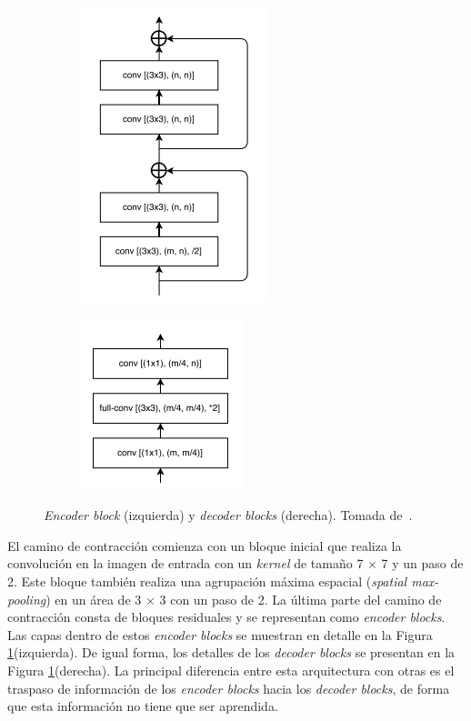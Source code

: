 \begin{figure}[ht]
	\centering
	\begin{subfigure}
		\centering
		\includegraphics[width=.4\linewidth]{./Graphics/encoder.png}
	\end{subfigure}
	\begin{subfigure}
		\centering
		\includegraphics[width=.4\linewidth]{./Graphics/decoder.png}
	\end{subfigure}
	\caption{\textit{Encoder block} (izquierda) y \textit{decoder blocks} (derecha). Tomada de~\cite{chaurasia2017linknet}.}
	\label{fig:blocks}
\end{figure}

El camino de contracción comienza con un bloque inicial que realiza la convolución en la imagen de entrada con un \textit{kernel} de tamaño 7 $\times$ 7 y un paso de 2. Este bloque también realiza una agrupación máxima espacial (\textit{spatial max-pooling}) en un área de 3 $\times$ 3 con un paso de 2. La última parte del camino de contracción consta de bloques residuales y se representan como \textit{encoder blocks}. Las capas dentro de estos \textit{encoder blocks} se muestran en detalle en la Figura \ref{fig:blocks}(izquierda). De igual forma, los detalles de los \textit{decoder blocks} se presentan en la Figura \ref{fig:blocks}(derecha). La principal diferencia entre esta arquitectura con otras es el traspaso de información de los \textit{encoder blocks} hacia los \textit{decoder blocks}, de forma que esta información no tiene que ser aprendida.

